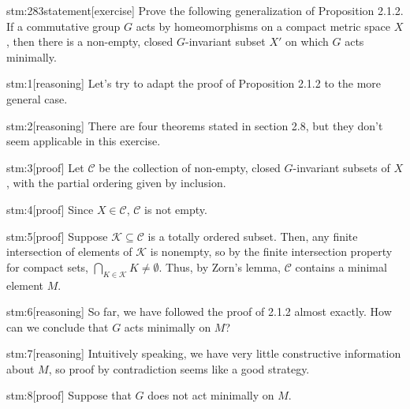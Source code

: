 
\begin{stm}{stm:283statement}[exercise]
Prove the following generalization of Proposition 2.1.2. If a commutative group $G$ acts by homeomorphisms on a compact metric space $X$, then there is a non-empty, closed $G$-invariant subset $X'$ on which $G$ acts minimally.
\end{stm}


\begin{stm}{stm:1}[reasoning]
Let's try to adapt the proof of Proposition 2.1.2 to the more general case.
\end{stm}

\begin{stm}{stm:2}[reasoning]
There are four theorems stated in section 2.8, but they don't seem applicable in this exercise.
\end{stm}

\begin{stm}{stm:3}[proof]
Let $\mathcal{C}$ be the collection of non-empty, closed $G$-invariant subsets of $X$, with the partial ordering given by inclusion.
\end{stm}

\begin{stm}{stm:4}[proof]
Since $X \in \mathcal{C}$, $\mathcal{C}$ is not empty.
\end{stm}

\begin{stm}{stm:5}[proof]
Suppose $\mathcal{K} \subseteq \mathcal{C}$ is a totally ordered subset. Then, any finite intersection of elements of $\mathcal{K}$ is nonempty, so by the finite intersection property for compact sets, $\bigcap_{K \in \mathcal{K}} K \ne \emptyset$. Thus, by Zorn's lemma, $\mathcal{C}$ contains a minimal element $M$.
\end{stm}

\begin{stm}{stm:6}[reasoning]
So far, we have followed the proof of 2.1.2 almost exactly. How can we conclude that $G$ acts minimally on $M$?
\end{stm}

\begin{stm}{stm:7}[reasoning]
Intuitively speaking, we have very little constructive information about $M$, so proof by contradiction seems like a good strategy.
\end{stm}

\begin{stm}{stm:8}[proof]
Suppose that $G$ does not act minimally on $M$.
\end{stm}

